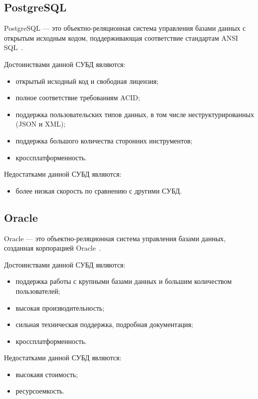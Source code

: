 \subsection{PostgreSQL}

PostgreSQL --- это объектно-реляционная система управления базами данных с
открытым исходным кодом, поддерживающая соответствие стандартам ANSI
SQL~\cite{site08}.

Достоинствами данной СУБД являются:
\begin{itemize}
    \item открытый исходный код и свободная лицензия;
    \item полное соответствие требованиям ACID;
    \item поддержка пользовательских типов данных, в том числе
        неструктурированных (JSON и XML);
    \item поддержка большого количества сторонних инструментов;
    \item кроссплатформенность.
\end{itemize}

Недостатками данной СУБД являются:
\begin{itemize}
    \item более низкая скорость по сравнению с другими СУБД.
\end{itemize}

\subsection{Oracle}

Oracle --- это объектно-реляционная система управления базами данных, созданная
корпорацией Oracle~\cite{site09}.

Достоинствами данной СУБД являются:
\begin{itemize}
    \item поддержка работы с крупными базами данных и большим количеством
        пользователей;
    \item высокая производительность;
    \item сильная техническая поддержка, подробная документация;
    \item кроссплатформенность.
\end{itemize}

Недостатками данной СУБД являются:
\begin{itemize}
    \item высокаяя стоимость;
    \item ресурсоемкость.
\end{itemize}

